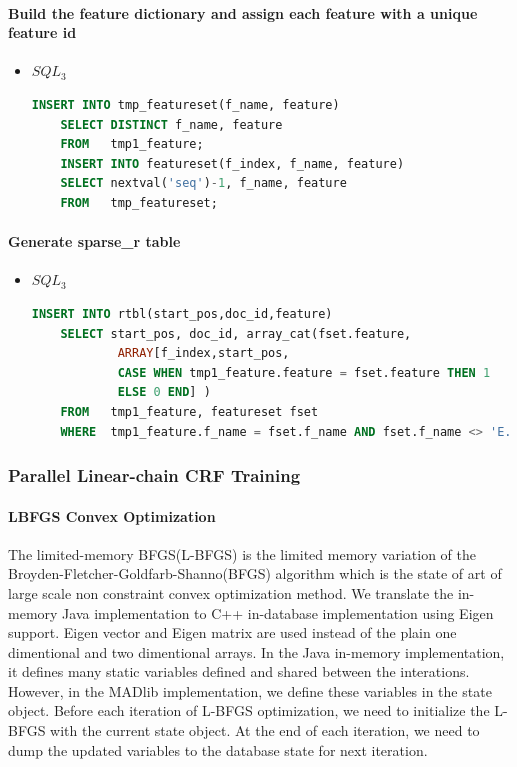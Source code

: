 \documentclass[11pt,letterpaper]{article}
\begin{document}
\paragraph{Build the feature dictionary and assign each feature with a unique feature id}
\begin{itemize}
\item $SQL_3$\\ 
\begin{lstlisting}[language=SQL,gobble=4]
    INSERT INTO tmp_featureset(f_name, feature) 
    SELECT DISTINCT f_name, feature
    FROM   tmp1_feature;
    INSERT INTO featureset(f_index, f_name, feature) 
    SELECT nextval('seq')-1, f_name, feature
    FROM   tmp_featureset;
\end{lstlisting}
\end{itemize}

\paragraph{Generate sparse\_r table}
\begin{itemize}
\item $SQL_3$\\ 
\begin{lstlisting}[language=SQL,gobble=4]
    INSERT INTO rtbl(start_pos,doc_id,feature)
    SELECT start_pos, doc_id, array_cat(fset.feature, 
			ARRAY[f_index,start_pos, 
			CASE WHEN tmp1_feature.feature = fset.feature THEN 1
			ELSE 0 END] )
    FROM   tmp1_feature, featureset fset
    WHERE  tmp1_feature.f_name = fset.f_name AND fset.f_name <> 'E.';
\end{lstlisting}
\end{itemize}


\subsubsection{Parallel Linear-chain CRF Training}

\paragraph{LBFGS Convex Optimization}
The limited-memory BFGS(L-BFGS) is the limited memory variation of the Broyden-Fletcher-Goldfarb-Shanno(BFGS) algorithm which
is the state of art of large scale non constraint convex optimization method.
We translate the in-memory Java implementation to C++ in-database implementation using Eigen support.
Eigen vector and Eigen matrix are used instead of the plain one dimentional and two dimentional arrays.
In the Java in-memory implementation, it defines many static variables defined and shared between the interations.
However, in the MADlib implementation, we define these variables in the state object.
Before each iteration of L-BFGS optimization, we need to initialize the L-BFGS with the current state object. 
At the end of each iteration, we need to dump the updated variables to the database state for next iteration.
\end{document}
